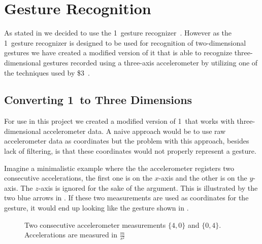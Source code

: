 \section{Gesture Recognition}
\label{sec:design:gesture-recognition}

As stated in  we decided to use the 1\textcent~gesture recognizer~\cite{herold20121}.
However as the 1\textcent~gesture recognizer is designed to be used for recognition of two-dimensional gestures we have created a modified version of it that is able to recognize three-dimensional gestures recorded using a three-axis accelerometer by utilizing one of the techniques used by \$3~\cite{three-dollar}.

\subsection{Converting 1\textcent~to Three Dimensions}
For use in this project we created a modified version of 1\textcent~that works with three-dimensional accelerometer data.
A naive approach would be to use raw accelerometer data as coordinates but the problem with this approach, besides lack of filtering, is that these coordinates would not properly represent a gesture.

Imagine a minimalistic example where the the accelerometer registers two consecutive accelerations, the first one is on the $x$-axis and the other is on the $y$-axis.
The $z$-axis is ignored for the sake of the argument.
This is illustrated by the two blue arrows in .
If these two measurements are used as coordinates for the gesture, it would end up looking like the gesture shown in .

\begin{figure}[h]
\centering
\caption{Two consecutive accelerometer measurements $\{4,0\}$ and $\{0,4\}$. Accelerations are measured in $\frac{m}{s^2}$}
\label{fig:accelerometerpoints}
\end{figure}


